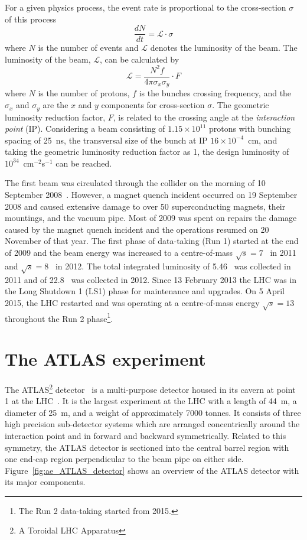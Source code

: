 For a given physics process, the event rate is proportional to the cross-section $\sigma$ of this process
%
\begin{equation}
    \frac{dN}{dt} = \mathcal{L}\cdot\sigma
\end{equation}
%
where $N$ is the number of events and $\mathcal{L}$ denotes the luminosity of the beam.
The luminosity of the beam, $\mathcal{L}$, can be calculated by
%
\begin{equation}
    \mathcal{L} = \frac{N^{2} f}{4 \pi \sigma_{x} \sigma_{y}} \cdot F
\end{equation}
%
where $N$ is the number of protons, $f$ is the bunches crossing frequency, and the $\sigma_{x}$ and $\sigma_{y}$ are the $x$ and $y$ components for cross-section $\sigma$.
The geometric luminosity reduction factor, $F$, is related to the crossing angle at the \textit{interaction point} (IP).
Considering a beam consisting of $1.15 \times 10^{11}$ protons with bunching spacing of 25~ns, the transversal size of the bunch at IP $16\times 10^{-4}$~cm, and taking the geometric luminosity reduction factor as 1, the design luminosity of $10^{34}$~cm$^{-2}$s$^{-1}$ can be reached.

The first beam was circulated through the collider on the morning of 10 September 2008~\cite{CERN-COURIER-Sep192008}.
However, a magnet quench incident occurred on 19 September 2008 and caused extensive damage to over 50 superconducting magnets, their mountings, and the vacuum pipe.
Most of 2009 was spent on repairs the damage caused by the magnet quench incident and the operations resumed on 20 November of that year.
The first phase of data-taking (Run 1) started at the end of 2009 and the beam energy was increased to a centre-of-mass $\sqrt{s}=7$~{\TeV} in 2011 and $\sqrt{s} = 8$~{\TeV} in 2012.
The total integrated luminosity of 5.46~{\ifb} was collected in 2011 and of 22.8~{\ifb} was collected in 2012.
Since 13 February 2013 the LHC was in the Long Shutdown 1 (LS1) phase for maintenance and upgrades.
On 5 April 2015, the LHC restarted and was operating at a centre-of-mass energy $\sqrt{s}=13$~{\TeV} throughout the Run 2 phase\footnote{The Run 2 data-taking started from 2015.}.


\section{The ATLAS experiment}
\label{sec:ae_ATLAS}
The ATLAS\footnote{A Toroidal LHC Apparatus} detector~\cite{Aad:2008zzm} is a multi-purpose detector housed in its cavern at point 1 at the LHC~\cite{Evans:2008zzb}.
It is the largest experiment at the LHC with a length of 44~m, a diameter of 25~m, and a weight of approximately 7000 tonnes.
It consists of three high precision sub-detector systems which are arranged concentrically around the interaction point and in forward and backward symmetrically.
Related to this symmetry, the ATLAS detector is sectioned into the central barrel region with one end-cap region perpendicular to the beam pipe on either side.
Figure~\ref{fig:ae_ATLAS_detector} shows an overview of the ATLAS detector with its major components.

